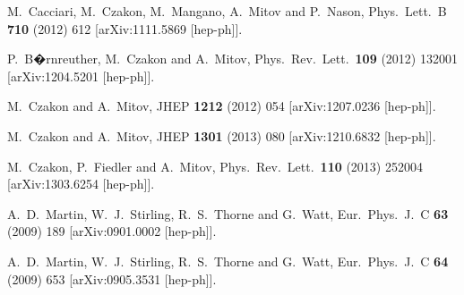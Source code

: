 \documentclass[preprintnumbers,superscriptaddress,nofootinbib,aps,prd,floatfix]{revtex4}
\begin{document}
\begin{thebibliography}{99}
  M.~Cacciari, M.~Czakon, M.~Mangano, A.~Mitov and P.~Nason,
  Phys.\ Lett.\ B {\bf 710} (2012) 612
  [arXiv:1111.5869 [hep-ph]].
  
  P.~B�rnreuther, M.~Czakon and A.~Mitov,
  Phys.\ Rev.\ Lett.\  {\bf 109} (2012) 132001
  [arXiv:1204.5201 [hep-ph]].

  M.~Czakon and A.~Mitov,
  JHEP {\bf 1212} (2012) 054
  [arXiv:1207.0236 [hep-ph]].
      
  M.~Czakon and A.~Mitov,
  JHEP {\bf 1301} (2013) 080
  [arXiv:1210.6832 [hep-ph]].
  
  M.~Czakon, P.~Fiedler and A.~Mitov,
  Phys.\ Rev.\ Lett.\  {\bf 110} (2013) 252004
  [arXiv:1303.6254 [hep-ph]].

  A.~D.~Martin, W.~J.~Stirling, R.~S.~Thorne and G.~Watt,
  Eur.\ Phys.\ J.\ C {\bf 63} (2009) 189
  [arXiv:0901.0002 [hep-ph]].

  A.~D.~Martin, W.~J.~Stirling, R.~S.~Thorne and G.~Watt,
  Eur.\ Phys.\ J.\ C {\bf 64} (2009) 653
  [arXiv:0905.3531 [hep-ph]].


\end{thebibliography}
\end{document}

